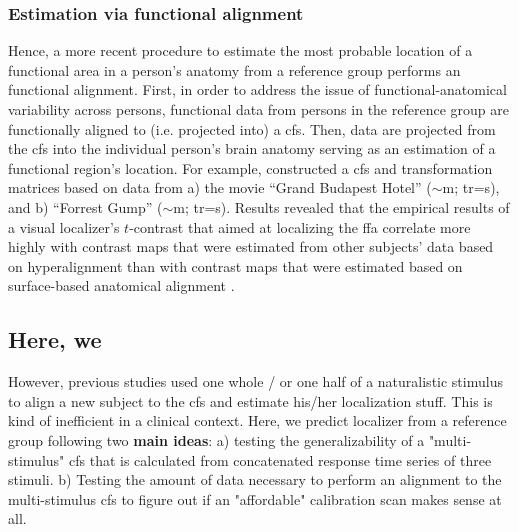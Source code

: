 \subsubsection{Estimation via functional alignment}
%
Hence, a more recent procedure \citep[e.g., ][]{jiahui2020predicting,
guntupalli2016model, haxby2011common} to estimate the most probable location of
a functional area in a person's anatomy from a reference group performs an
functional alignment.
First, in order to address the issue of functional-anatomical variability across
persons, functional data from persons in the reference group are functionally
aligned to (i.e. projected into) a \ac{cfs}.
%
Then, data are projected from the \ac{cfs} into the individual person's brain
anatomy serving as an estimation of a functional region's location.
For example, \citep{jiahui2020predicting} constructed a \ac{cfs} and
transformation matrices based on data from a) the movie ``Grand Budapest Hotel''
($\sim$\unit[50]{m}; \ac{tr}=\unit[1]{s}), and b) ``Forrest Gump''
($\sim$\unit[120]{m}; \ac{tr}=\unit[2]{s}).
Results revealed that the empirical results of a visual localizer's $t$-contrast
that aimed at localizing the \ac{ffa} correlate more highly with contrast maps
that were estimated from other subjects' data based on hyperalignment than with
contrast maps that were estimated based on surface-based anatomical alignment
\citep{jiahui2020predicting}.


\newpage

\subsection{Here, we}


However, previous studies used one whole / or one half of a naturalistic
stimulus to align a new subject to the \ac{cfs} and estimate his/her
localization stuff.
%
This is kind of inefficient in a clinical context.
%
Here, we predict localizer from a reference group following two \textbf{main
ideas}:
%
a) testing the generalizability of a "multi-stimulus" \ac{cfs} that is
calculated from concatenated response time series of three stimuli.
%
b) Testing the amount of data necessary to perform an alignment to the
multi-stimulus \ac{cfs} to figure out if an "affordable" calibration scan makes
sense at all.





